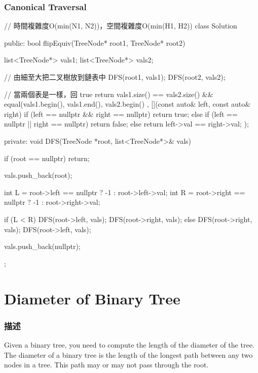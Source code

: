 \subsubsection{Canonical Traversal}
\begin{Code}
// 時間複雜度O(min(N1, N2))，空間複雜度O(min(H1, H2))
class Solution {
public:
    bool flipEquiv(TreeNode* root1, TreeNode* root2) {
        list<TreeNode*> vals1;
        list<TreeNode*> vals2;

        // 由細至大把二叉樹放到鏈表中
        DFS(root1, vals1);
        DFS(root2, vals2);

        // 當兩個表是一樣，回 true
        return vals1.size() == vals2.size()
            && equal(vals1.begin(), vals1.end(), vals2.begin()
                     , [](const auto& left, const auto& right)
                     {
                         if (left == nullptr && right == nullptr) return true;
                         else if (left == nullptr || right == nullptr) return false;
                         else return left->val == right->val;
                     });
    }
private:
    void DFS(TreeNode *root, list<TreeNode*>& vals)
    {
        if (root == nullptr) return;

        vals.push_back(root);

        int L = root->left == nullptr ? -1 : root->left->val;
        int R = root->right == nullptr ? -1 : root->right->val;

        if (L < R)
        {
            DFS(root->left, vals);
            DFS(root->right, vals);
        }
        else
        {
            DFS(root->right, vals);
            DFS(root->left, vals);
        }

        vals.push_back(nullptr);
    }
};
\end{Code}

\section{Diameter of Binary Tree} %
\label{sec:diameter-of-binary-tree}


\subsubsection{描述}
Given a binary tree, you need to compute the length of the diameter of the tree. The diameter of a binary tree is the length of the longest path between any two nodes in a tree. This path may or may not pass through the root.

